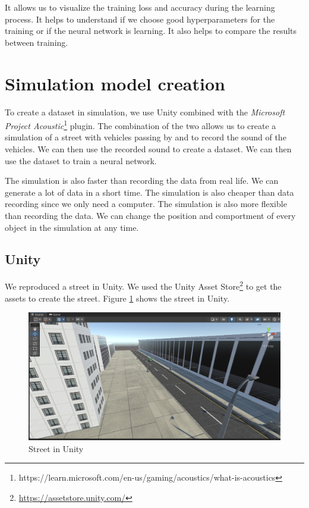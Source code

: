 It allows us to visualize the training loss and accuracy during the learning process. It helps to understand if we choose good hyperparameters for the training or if the neural network is learning. It also helps to compare the results between training. 

\section{Simulation model creation}

To create a dataset in simulation, we use Unity combined with the \textit{Microsoft Project Acoustic}\footnote{https://learn.microsoft.com/en-us/gaming/acoustics/what-is-acoustics} plugin. The combination of the two allows us to create a simulation of a street with vehicles passing by and to record the sound of the vehicles. We can then use the recorded sound to create a dataset. We can then use the dataset to train a neural network.

The simulation is also faster than recording the data from real life. We can generate a lot of data in a short time. The simulation is also cheaper than data recording since we only need a computer. The simulation is also more flexible than recording the data. We can change the position and comportment of every object in the simulation at any time.

\subsection{Unity}

We reproduced a street in Unity. We used the Unity Asset Store\footnote{\url{https://assetstore.unity.com/}} to get the assets to create the street. Figure \ref{fig:simulation_modelization} shows the street in Unity.

\begin{figure}[H]
    \centering
    \includegraphics[width=.8\textwidth]{images/simulation_modelization.png}
    \caption{Street in Unity}
    \label{fig:simulation_modelization}
\end{figure}

